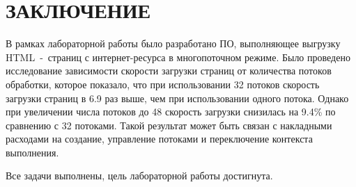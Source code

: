 \chapter*{ЗАКЛЮЧЕНИЕ}

В рамках лабораторной работы было разработано ПО, выполняющее выгрузку HTML~-~страниц с интернет-ресурса в многопоточном режиме. Было проведено исследование зависимости скорости загрузки страниц от количества потоков обработки, которое показало, что при использовании 32 потоков скорость загрузки страниц в 6.9 раз выше, чем при использовании одного потока. Однако при увеличении числа потоков до 48 скорость загрузки снизилась на 9.4\% по сравнению с 32 потоками. Такой результат может быть связан с накладными расходами на создание, управление потоками и переключение контекста выполнения. 

Все задачи выполнены, цель лабораторной работы достигнута.
